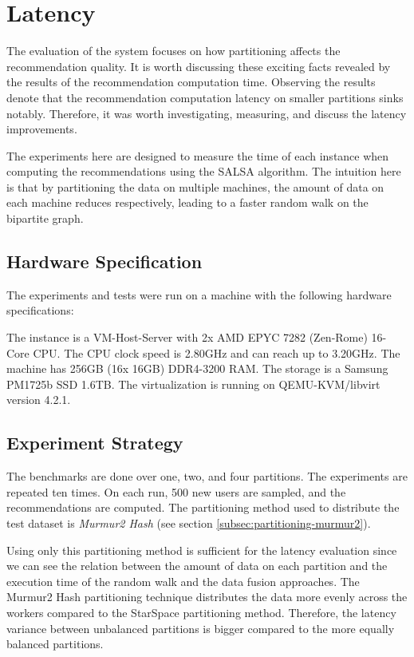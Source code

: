 \section{Latency}
\label{sec:eval-latency}
The evaluation of the system focuses on how partitioning affects the recommendation quality. It is worth discussing these exciting facts revealed by the results of the recommendation computation time. Observing the results denote that the recommendation computation latency on smaller partitions sinks notably. Therefore, it was worth investigating, measuring, and discuss the latency improvements.


The experiments here are designed to measure the time of each instance when computing the recommendations using the SALSA algorithm. The intuition here is that by partitioning the data on multiple machines, the amount of data on each machine reduces respectively, leading to a faster random walk on the bipartite graph. 

\subsection{Hardware Specification}
\label{subsec:hardware-spec}
The experiments and tests were run on a machine with the following hardware specifications:

The instance is a VM-Host-Server with 2x AMD EPYC 7282 (Zen-Rome) 16-Core CPU. The CPU clock speed is 2.80GHz and can reach up to 3.20GHz. The machine has 256GB (16x 16GB) DDR4-3200 RAM. The storage is a Samsung PM1725b SSD 1.6TB. The virtualization is running on QEMU-KVM/libvirt version 4.2.1.


\subsection{Experiment Strategy}
\label{subsec:latency-experiment-strategy}
The benchmarks are done over one, two, and four partitions. The experiments are repeated ten times. On each run, 500 new users are sampled, and the recommendations are computed. The partitioning method used to distribute the test dataset is \emph{Murmur2 Hash} (see section \ref{subsec:partitioning-murmur2}). 


Using only this partitioning method is sufficient for the latency evaluation since we can see the relation between the amount of data on each partition and the execution time of the random walk and the data fusion approaches. The Murmur2 Hash partitioning technique distributes the data more evenly across the workers compared to the StarSpace partitioning method. Therefore, the latency variance between unbalanced partitions is bigger compared to the more equally balanced partitions.

